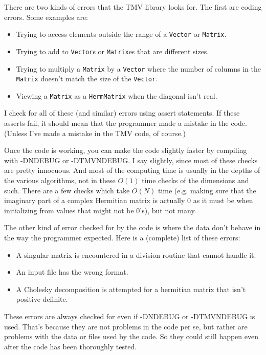 \documentclass[twoside,letterpaper,11pt]{article}
\renewcommand{\tt}[1]{{\lstinline {#1}}}
\begin{document}
There are two kinds of errors that the TMV library looks for.  The first are 
coding errors.  Some examples are:
\begin{itemize}
\item
Trying to access elements outside the range of a \tt{Vector} or \tt{Matrix}.
\item
Trying to add to \tt{Vector}s or \tt{Matrix}es that are different sizes.
\item
Trying to multiply a \tt{Matrix} by a \tt{Vector} where the number of columns 
in the \tt{Matrix} doesn't match the size of the \tt{Vector}.
\item
Viewing a \tt{Matrix} as a \tt{HermMatrix} when the diagonal isn't real.
\end{itemize}

I check for all of these (and similar) errors using assert statements.
If these asserts fail, it should mean that
the programmer made a mistake in the code.  (Unless I've made a 
mistake in the TMV code, of course.)

Once the code is working, you can make the code slightly faster by 
compiling with -DNDEBUG or -DTMVNDEBUG.  I say slightly, since most of these checks 
are pretty innocuous.  And most of the computing time is usually in the depths
of the various algorithms, not in these $O(1)$ time checks of the dimensions and such.  
There are a few checks which take $O(N)$ time (e.g. making sure that the imaginary
part of a complex Hermitian matrix is actually 0 as it must be when initializing from values
that might not be 0's), but not many.

The other kind of error checked for by the code is 
where the data don't behave in the way
the programmer expected.  Here is a (complete) list of these errors:
\begin{itemize}
\item
A singular matrix is encountered in a division routine that cannot handle it.
\item
An input file has the wrong format.
\item
A Cholesky decomposition is attempted for a
hermitian matrix that isn't positive definite.
\end{itemize}

These errors are always checked for even if -DNDEBUG or -DTMVNDEBUG is used.
That's because they are not problems in the code per se, but rather
are problems with the data or files used by the code.  So they could
still happen even after the code has been thoroughly tested.
\end{document}
